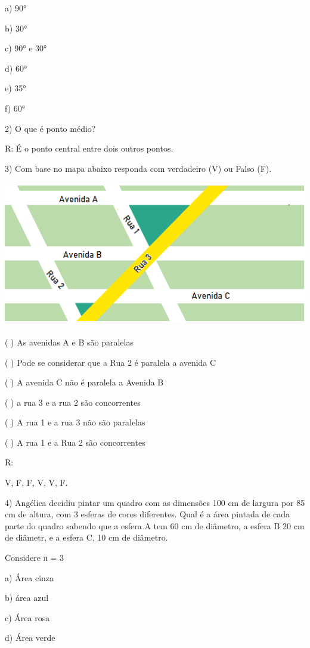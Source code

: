 a) 90°

b) 30°

c) 90° e 30°

d) 60°

e) 35°

f) 60°

2) O que é ponto médio?

R: É o ponto central entre dois outros pontos.

3) Com base no mapa abaixo responda com verdadeiro (V) ou Falso (F).

\includegraphics[width=5.47917in,height=2.48958in]{./imgSAEB_6_MAT/media/image53.png}

( ) As avenidas A e B são paralelas

( ) Pode se considerar que a Rua 2 é paralela a avenida C

( ) A avenida C não é paralela a Avenida B

( ) a rua 3 e a rua 2 são concorrentes

( ) A rua 1 e a rua 3 não são paralelas

( ) A rua 1 e a Rua 2 são concorrentes

R:

V, F, F, V, V, F.

4) Angélica decidiu pintar um quadro com as dimensões 100 cm de largura
por 85 cm de altura, com 3 esferas de cores diferentes. Qual é a área
pintada de cada parte do quadro sabendo que a esfera A tem 60 cm de
diâmetro, a esfera B 20 cm de diâmetr, e a esfera C, 10 cm de diâmetro.

Considere π = 3

a) Área cinza

b) área azul

c) Área rosa

d) Área verde

